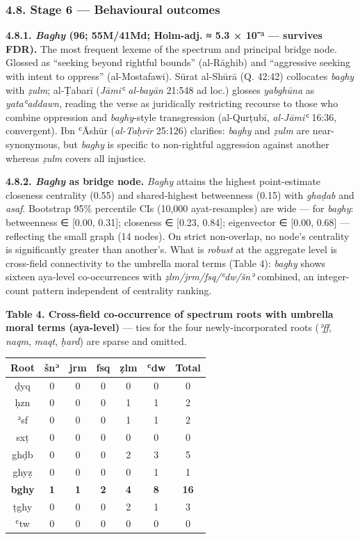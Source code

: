 \documentclass[11pt,a4paper]{article}
\begin{document}
\subsubsection{4.8. Stage 6 --- Behavioural
outcomes}\label{stage-6-behavioural-outcomes}

\textbf{4.8.1. \emph{Baghy} (96; 55M/41Md; Holm-adj. ≈ 5.3 × 10⁻³ ---
survives FDR).} The most frequent lexeme of the spectrum and principal
bridge node. Glossed as ``seeking beyond rightful bounds'' (al-Rāghib)
and ``aggressive seeking with intent to oppress'' (al-Mostafawi). Sūrat
al-Shūrā (Q. 42:42) collocates \emph{baghy} with \emph{ẓulm}; al-Ṭabarī
(\emph{Jāmiʿ al-bayān} 21:548 ad loc.) glosses \emph{yabghūna} as
\emph{yataʿaddawn}, reading the verse as juridically restricting
recourse to those who combine oppression and \emph{baghy}-style
transgression (al-Qurṭubī, \emph{al-Jāmiʿ} 16:36, convergent). Ibn
ʿĀshūr (\emph{al-Taḥrīr} 25:126) clarifies: \emph{baghy} and \emph{ẓulm}
are near-synonymous, but \emph{baghy} is specific to non-rightful
aggression against another whereas \emph{ẓulm} covers all injustice.

\textbf{4.8.2. \emph{Baghy} as bridge node.} \emph{Baghy} attains the
highest point-estimate closeness centrality (0.55) and shared-highest
betweenness (0.15) with \emph{ghaḍab} and \emph{asaf}. Bootstrap 95\%
percentile CIs (10,000 ayat-resamples) are wide --- for \emph{baghy}:
betweenness ∈ {[}0.00, 0.31{]}; closeness ∈ {[}0.23, 0.84{]};
eigenvector ∈ {[}0.00, 0.68{]} --- reflecting the small graph (14
nodes). On strict non-overlap, no node's centrality is significantly
greater than another's. What is \emph{robust} at the aggregate level is
cross-field connectivity to the umbrella moral terms (Table 4):
\emph{baghy} shows sixteen aya-level co-occurrences with
\emph{ẓlm/jrm/fsq/ʿdw/šnʾ} combined, an integer-count pattern
independent of centrality ranking.

\textbf{Table 4. Cross-field co-occurrence of spectrum roots with
umbrella moral terms (aya-level)} --- ties for the four
newly-incorporated roots (\emph{ʾff}, \emph{naqm}, \emph{maqt},
\emph{ḥard}) are sparse and omitted.

\begin{longtable}[]{@{}ccccccc@{}}
\toprule\noalign{}
Root & šnʾ & jrm & fsq & ẓlm & ʿdw & Total \\
\midrule\noalign{}
\endhead
\bottomrule\noalign{}
\endlastfoot
ḍyq & 0 & 0 & 0 & 0 & 0 & 0 \\
ḥzn & 0 & 0 & 0 & 1 & 1 & 2 \\
ʾsf & 0 & 0 & 0 & 1 & 1 & 2 \\
sxṭ & 0 & 0 & 0 & 0 & 0 & 0 \\
ghḍb & 0 & 0 & 0 & 2 & 3 & 5 \\
ghyẓ & 0 & 0 & 0 & 0 & 1 & 1 \\
\textbf{bghy} & \textbf{1} & \textbf{1} & \textbf{2} & \textbf{4} &
\textbf{8} & \textbf{16} \\
ṭghy & 0 & 0 & 0 & 2 & 1 & 3 \\
ʿtw & 0 & 0 & 0 & 0 & 0 & 0 \\
\end{longtable}
\end{document}
